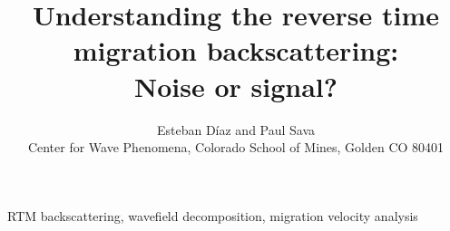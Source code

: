 



\author[E.~D\'{i}az and P.~Sava]{Esteban D\'{i}az and Paul Sava\\ 
Center for Wave Phenomena,  
Colorado School of Mines, Golden CO 80401}

\title[Understanding RTM backscattering]{Understanding the reverse time migration backscattering:\\%
Noise or signal?}


\maketitle

\begin{keywords}
RTM backscattering, wavefield decomposition, migration velocity analysis
\end{keywords}






\cleardoublepage

